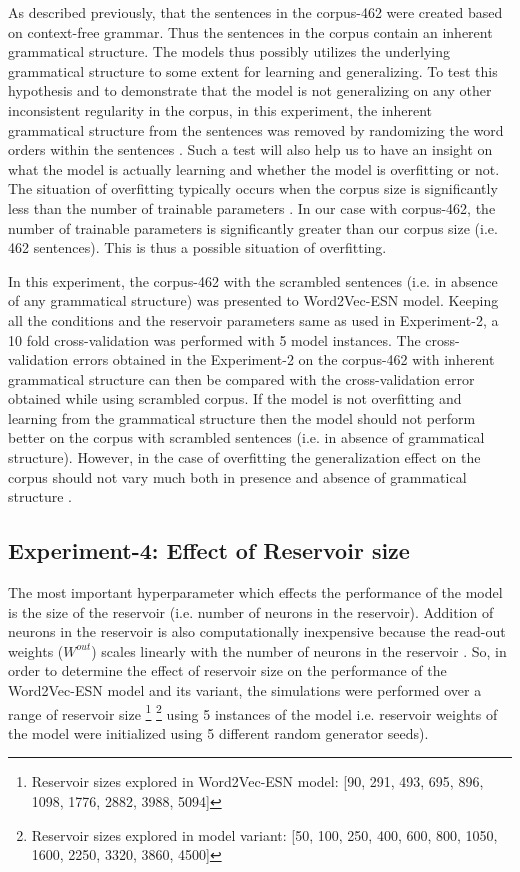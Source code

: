 As described previously, that the sentences in the corpus-462 were created based on context-free grammar. Thus the sentences in the corpus contain an inherent grammatical structure. The models thus possibly utilizes the underlying grammatical structure to some extent for learning and generalizing. To test this hypothesis and to demonstrate that the model is not generalizing on any other inconsistent regularity in the corpus, in this experiment, the inherent grammatical structure from the sentences was removed by randomizing the word orders within the sentences \cite{xavier:2013:RT}. Such a test will also help us to have an insight on what the model is actually learning and whether the model is overfitting or not. The situation of overfitting typically occurs when the corpus size is significantly less than the number of trainable parameters \cite{xavier:2013:RT}. In our case with corpus-462, the number of trainable parameters is significantly greater than our corpus size (i.e. 462 sentences). This is thus a possible situation of overfitting.

In this experiment, the corpus-462 with the scrambled sentences (i.e. in absence of any grammatical structure) was presented to Word2Vec-ESN model. Keeping all the conditions and the reservoir parameters same as used in Experiment-2, a 10 fold cross-validation was performed with 5 model instances. The cross-validation errors obtained in the Experiment-2 on the corpus-462 with inherent grammatical structure can then be compared with the cross-validation error obtained while using scrambled corpus. If the model is not overfitting and learning from the grammatical structure then the model should not perform better on the corpus with scrambled sentences (i.e. in absence of grammatical structure). However, in the case of overfitting the generalization effect on the corpus should not vary much both in presence and absence of grammatical structure \cite{xavier:2013:RT}. 

\subsection{Experiment-4: Effect of Reservoir size} \label{exp-4}

The most important hyperparameter which effects the performance of the model is the size of the reservoir (i.e. number of neurons in the reservoir). Addition of neurons in the reservoir is also computationally inexpensive because the read-out weights ($W^{out}$) scales linearly with the number of neurons in the reservoir \cite{esn:learn_gs}. So, in order to determine the effect of reservoir size on the performance of the Word2Vec-ESN model and its variant, the simulations were performed over a range of reservoir size \footnote[1]{Reservoir sizes explored in Word2Vec-ESN model: [90, 291, 493, 695, 896, 1098, 1776, 2882, 3988, 5094]} \footnote[2]{Reservoir sizes explored in model variant: [50, 100, 250, 400, 600, 800, 1050, 1600, 2250, 3320, 3860, 4500]} using 5 instances of the model i.e. reservoir weights of the model were initialized using 5 different random generator seeds). 

